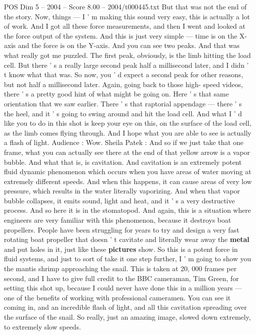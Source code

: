 \begin{textsample}{POS Dim 5 – 2004 – Score 8.00 – 2004/t000445.txt}
But that was not the end of the story.
Now, things — I ' m making this sound very easy, this is actually a lot of work.
And I got all these force measurements, and then I went and looked at the force output of the system.
And this is just very simple — time is on the X- axis and the force is on the Y-axis.
And you can see two peaks.
And that was what really got me puzzled.
The first peak, obviously, is the limb hitting the load cell.
But there ' s a really large second peak half a millisecond later, and I didn ' t know what that was.
So now, you ' d expect a second peak for other reasons, but not half a millisecond later.
Again, going back to those high- speed videos, there ' s a pretty good hint of what might be going on.
Here ' s that same orientation that we saw earlier.
There ' s that raptorial appendage — there ' s the heel, and it ' s going to swing around and hit the load cell.
And what I ' d like you to do in this shot is keep your eye on this, on the surface of the load cell, as the limb comes flying through.
And I hope what you are able to see is actually a flash of light.
Audience : Wow.
Sheila Patek : And so if we just take that one frame, what you can actually see there at the end of that yellow arrow is a vapor bubble.
And what that is, is cavitation.
And cavitation is an extremely potent fluid dynamic phenomenon which occurs when you have areas of water moving at extremely different speeds.
And when this happens, it can cause areas of very low pressure, which results in the water literally vaporizing.
And when that vapor bubble collapses, it emits sound, light and heat, and it ' s a very destructive process.
And so here it is in the stomatopod.
And again, this is a situation where engineers are very familiar with this phenomenon, because it destroys boat propellers.
People have been struggling for years to try and design a very fast rotating boat propeller that doesn ' t cavitate and literally wear away the \textbf{metal} and put holes in it, just like these \textbf{pictures} show.
So this is a potent force in fluid systems, and just to sort of take it one step further, I ' m going to show you the mantis shrimp approaching the snail.
This is taken at 20, 000 frames per second, and I have to give full credit to the BBC cameraman, Tim Green, for setting this shot up, because I could never have done this in a million years — one of the benefits of working with professional cameramen.
You can see it coming in, and an incredible flash of light, and all this cavitation spreading over the surface of the snail.
So really, just an amazing image, slowed down extremely, to extremely slow speeds.

\end{textsample}
